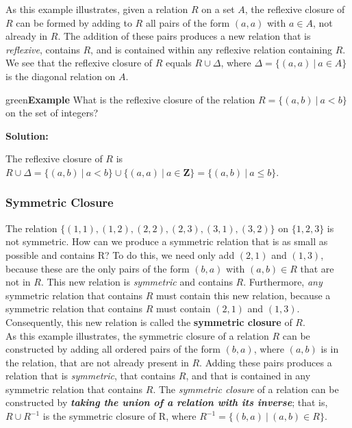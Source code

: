 \documentclass[11pt]{article}
\newenvironment{example}[1][\unskip]{\begin{mybox}{green}{\textbf{Example} {#1}}}{\end{mybox}}
\begin{document}
As this example illustrates, given a relation $R$ on a set $A$, the reflexive closure of $R$ can be formed by adding to $R$ all pairs of the form $(a, a)$ with $a \in A$, not already in $R$. The addition of these pairs produces a new relation that is \textit{reflexive}, contains $R$, and is contained within any reflexive relation containing $R$. We see that the reflexive closure of $R$ equals $R \cup \Delta$, where $\Delta = \{(a, a)\ |\ a \in A\}$ is the diagonal relation on $A$.

\begin{example}
What is the reflexive closure of the relation $R = \{(a, b)\ |\ a < b\}$ on the set of integers?

\textbf{Solution:}

The reflexive closure of $R$ is $R \cup \Delta = \{(a, b)\ |\ a < b\} \cup \{(a, a)\ |\ a \in \mathbf{Z}\} = \{(a, b)\ |\ a \leq b\}$.
\end{example}


\subsubsection{Symmetric Closure}

The relation $\{(1, 1), (1, 2), (2, 2), (2, 3), (3, 1), (3, 2)\}$ on $\{1, 2, 3\}$ is not symmetric. How can we produce a symmetric relation that is as small as possible and contains R? To do this, we need only add $(2, 1)$ and $(1, 3)$, because these are the only pairs of the form $(b, a)$ with $(a, b) \in R$ that are not in $R$. This new relation is \textit{symmetric} and contains $R$. Furthermore, \textit{any} symmetric relation that contains $R$ must contain this new relation, because a symmetric relation that contains $R$ must contain $(2, 1)$ and $(1, 3)$. Consequently, this new relation is called the \textbf{symmetric closure} of $R$.\\

As this example illustrates, the symmetric closure of a relation $R$ can be constructed by adding all ordered pairs of the form $(b, a)$, where $(a, b)$ is in the relation, that are not already present in $R$. Adding these pairs produces a relation that is \textit{symmetric}, that contains $R$, and that is contained in any symmetric relation that contains $R$. The \textit{symmetric closure} of a relation can be constructed by \textit{\textbf{taking the union of a relation with its inverse}}; that is, $R \cup R^{-1}$ is the symmetric closure of R, where $R^{-1} = \{(b, a)\ |\ (a, b) \in R\}$.
\end{document}
